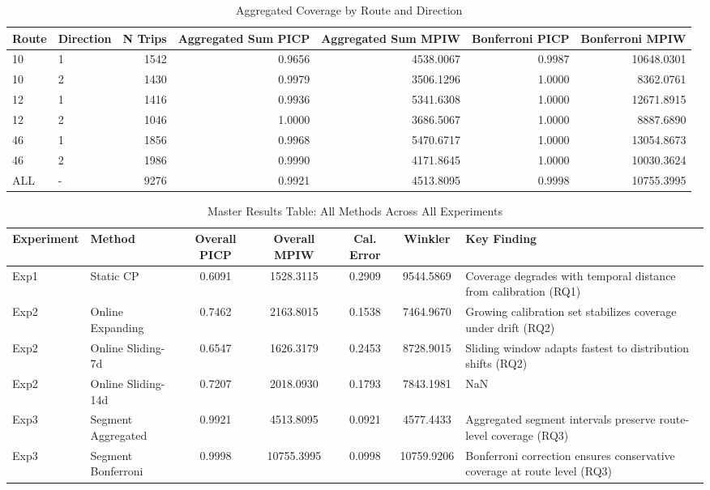 \begin{table}
\caption{Aggregated Coverage by Route and Direction}
\label{tab:t63_aggregated_coverage}
\begin{tabular}{llrrrrr}
\toprule
Route & Direction & N Trips & Aggregated Sum PICP & Aggregated Sum MPIW & Bonferroni PICP & Bonferroni MPIW \\
\midrule
10 & 1 & 1542 & 0.9656 & 4538.0067 & 0.9987 & 10648.0301 \\
10 & 2 & 1430 & 0.9979 & 3506.1296 & 1.0000 & 8362.0761 \\
12 & 1 & 1416 & 0.9936 & 5341.6308 & 1.0000 & 12671.8915 \\
12 & 2 & 1046 & 1.0000 & 3686.5067 & 1.0000 & 8887.6890 \\
46 & 1 & 1856 & 0.9968 & 5470.6717 & 1.0000 & 13054.8673 \\
46 & 2 & 1986 & 0.9990 & 4171.8645 & 1.0000 & 10030.3624 \\
ALL & - & 9276 & 0.9921 & 4513.8095 & 0.9998 & 10755.3995 \\
\bottomrule
\end{tabular}
\end{table}



\begin{table}
\caption{Master Results Table: All Methods Across All Experiments}
\label{tab:master_results}
\begin{tabular}{llccccl}
\toprule
Experiment & Method & Overall PICP & Overall MPIW & Cal. Error & Winkler & Key Finding \\
\midrule
Exp1 & Static CP & 0.6091 & 1528.3115 & 0.2909 & 9544.5869 & Coverage degrades with temporal distance from calibration (RQ1) \\
Exp2 & Online Expanding & 0.7462 & 2163.8015 & 0.1538 & 7464.9670 & Growing calibration set stabilizes coverage under drift (RQ2) \\
Exp2 & Online Sliding-7d & 0.6547 & 1626.3179 & 0.2453 & 8728.9015 & Sliding window adapts fastest to distribution shifts (RQ2) \\
Exp2 & Online Sliding-14d & 0.7207 & 2018.0930 & 0.1793 & 7843.1981 & NaN \\
Exp3 & Segment Aggregated & 0.9921 & 4513.8095 & 0.0921 & 4577.4433 & Aggregated segment intervals preserve route-level coverage (RQ3) \\
Exp3 & Segment Bonferroni & 0.9998 & 10755.3995 & 0.0998 & 10759.9206 & Bonferroni correction ensures conservative coverage at route level (RQ3) \\
\bottomrule
\end{tabular}
\end{table}



